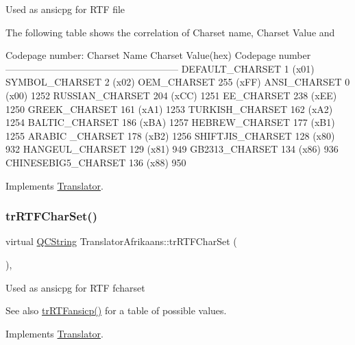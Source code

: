 Used as ansicpg for R\+TF file

The following table shows the correlation of Charset name, Charset Value and 
\begin{DoxyPre}
Codepage number:
Charset Name       Charset Value(hex)  Codepage number
------------------------------------------------------
DEFAULT\_CHARSET           1 (x01)
SYMBOL\_CHARSET            2 (x02)
OEM\_CHARSET             255 (xFF)
ANSI\_CHARSET              0 (x00)            1252
RUSSIAN\_CHARSET         204 (xCC)            1251
EE\_CHARSET              238 (xEE)            1250
GREEK\_CHARSET           161 (xA1)            1253
TURKISH\_CHARSET         162 (xA2)            1254
BALTIC\_CHARSET          186 (xBA)            1257
HEBREW\_CHARSET          177 (xB1)            1255
ARABIC \_CHARSET         178 (xB2)            1256
SHIFTJIS\_CHARSET        128 (x80)             932
HANGEUL\_CHARSET         129 (x81)             949
GB2313\_CHARSET          134 (x86)             936
CHINESEBIG5\_CHARSET     136 (x88)             950
\end{DoxyPre}
 

Implements \mbox{\hyperlink{class_translator_a9953a4c0e6a4fc7d017abcd5c2939e0f}{Translator}}.

\mbox{\label{class_translator_afrikaans_a5cc57f69ec8e25716ba47676a3bdf2d1}} 
\subsubsection{\texorpdfstring{trRTFCharSet()}{trRTFCharSet()}}
{\footnotesize\ttfamily virtual \mbox{\hyperlink{class_q_c_string}{Q\+C\+String}} Translator\+Afrikaans\+::tr\+R\+T\+F\+Char\+Set (\begin{DoxyParamCaption}{ }\end{DoxyParamCaption})\hspace{0.3cm}{\ttfamily [inline]}, {\ttfamily [virtual]}}

Used as ansicpg for R\+TF fcharset \begin{DoxySeeAlso}{See also}
\mbox{\hyperlink{class_translator_afrikaans_a13bcc041069710cb537ffdedb1b7359d}{tr\+R\+T\+Fansicp()}} for a table of possible values. 
\end{DoxySeeAlso}


Implements \mbox{\hyperlink{class_translator_afad391f3cbfb5ce6332b7239f8e2049a}{Translator}}.

